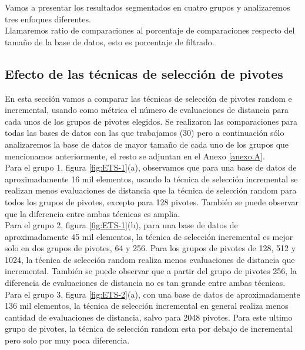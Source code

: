 Vamos a presentar los resultados segmentados en cuatro grupos y analizaremos tres enfoques diferentes.\\

Llamaremos ratio de comparaciones al porcentaje de comparaciones respecto del tamaño de la base de datos, esto es porcentaje de filtrado.\\

\subsection{Efecto de las t\'ecnicas de selecci\'on de pivotes}

En esta secci\'on vamos a comparar las t\'ecnicas de selecci\'on de pivotes random e incremental, usando como m\'etrica el n\'umero de evaluaciones de distancia para cada unos de los grupos de pivotes elegidos. Se realizaron las comparaciones para todas las bases de datos con las que trabajamos (30) pero a continuaci\'on s\'olo analizaremos la base de datos de mayor tama\~no de cada uno de los grupos que mencionamos anteriormente, el resto se adjuntan en el Anexo \ref{anexo.A}.\\

Para el grupo 1, figura \ref{fig:ETS-1}(a), observamos que para una base de datos de aproximadamente 16 mil elementos,  usando la t\'ecnica de selecci\'on incremental se realizan menos evaluaciones de distancia que la t\'ecnica de selecci\'on random para todos los grupos de pivotes, excepto para 128 pivotes. Tambi\'en se puede observar que la diferencia entre ambas t\'ecnicas es amplia.\\

Para el grupo 2, figura \ref{fig:ETS-1}(b), para una base de datos de aproximadamente 45 mil elementos, la t\'ecnica de selecci\'on incremental es mejor solo en dos grupos de pivotes, 64 y 256. Para los grupos de pivotes de 128, 512 y 1024, la t\'ecnica de selecci\'on random realiza menos evaluaciones de distancia que incremental. Tambi\'en se puede observar que a partir del grupo de pivotes 256, la diferencia de evaluaciones de distancia no es tan grande entre ambas t\'ecnicas.\\

Para el grupo 3, figura \ref{fig:ETS-2}(a), con una base de datos de aproximadamente 136 mil elementos, la t\'ecnica de selecci\'on incremental en general realiza menos cantidad de evaluaciones de distancia, salvo para 2048 pivotes. Para este ultimo grupo de pivotes, la t\'ecnica de selecci\'on random esta por debajo de incremental pero solo por muy poca diferencia.\\

